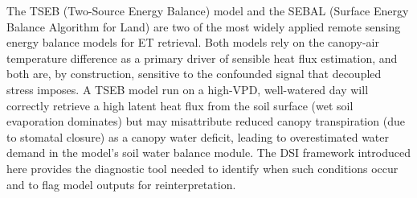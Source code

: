 \documentclass[review,12pt]{elsarticle}
\begin{document}
\begin{table}[H]
\centering
\caption{Comparison of the proposed AquaVolt-AI Decoupled Stress Framework (DSI) with recent state-of-the-art studies (2020--2024) in satellite-based crop water stress detection. \textbf{Bold} indicates superior performance or capability. $\checkmark$ = available; $\times$ = not available; $\approx$ = partially available.}
\label{tab:comparison}
\end{table}

The TSEB (Two-Source Energy Balance) model \citep{norman1995source, timmermans2007relationship} and the SEBAL (Surface Energy Balance Algorithm for Land) \citep{bastiaanssen1998remote} are two of the most widely applied remote sensing energy balance models for ET retrieval. Both models rely on the canopy-air temperature difference as a primary driver of sensible heat flux estimation, and both are, by construction, sensitive to the confounded signal that decoupled stress imposes. A TSEB model run on a high-VPD, well-watered day will correctly retrieve a high latent heat flux from the soil surface (wet soil evaporation dominates) but may misattribute reduced canopy transpiration (due to stomatal closure) as a canopy water deficit, leading to overestimated water demand in the model's soil water balance module. The DSI framework introduced here provides the diagnostic tool needed to identify when such conditions occur and to flag model outputs for reinterpretation.
\end{document}
